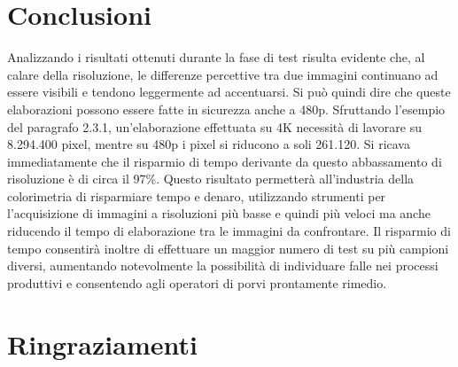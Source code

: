 \documentclass[a4paper,11pt]{article}
\begin{document}
    \newpage
    \section{Conclusioni} 
    Analizzando i risultati ottenuti durante la fase di test risulta evidente che, al calare della risoluzione, 
    le differenze percettive tra due immagini continuano ad essere visibili e tendono leggermente ad accentuarsi.
    Si può quindi dire che queste elaborazioni possono essere fatte in sicurezza anche a 480p. 
    Sfruttando l'esempio del paragrafo 2.3.1, un'elaborazione effettuata su 4K necessità di lavorare su 8.294.400 pixel, mentre su 480p i pixel si riducono a soli 261.120.
    Si ricava immediatamente che il risparmio di tempo derivante da questo abbassamento di risoluzione è di circa il 97\%.
    Questo risultato permetterà all'industria della colorimetria di risparmiare tempo e denaro, utilizzando strumenti per l'acquisizione di immagini
    a risoluzioni più basse e quindi più veloci ma anche riducendo il tempo di elaborazione tra le immagini da confrontare.
    Il risparmio di tempo consentirà inoltre di effettuare un maggior numero di test su più campioni diversi, aumentando notevolmente la possibilità di individuare falle 
    nei processi produttivi e consentendo agli operatori di porvi prontamente rimedio.
    \newpage
    \section{Ringraziamenti}
    \lipsum[1-3]
    
\end{document}
